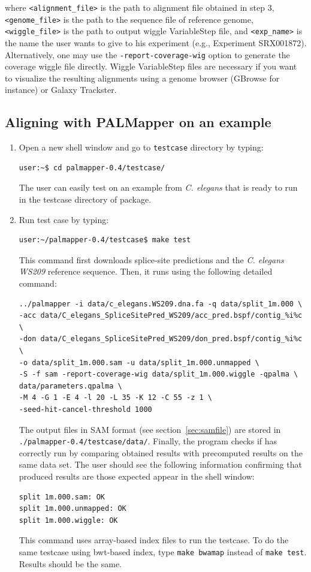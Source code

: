 \documentclass{article}
\begin{document}
\begin{enumerate}
where \texttt{<alignment\_file>} is the path to alignment file
obtained in step 3, \texttt{<genome\_file>} is the path to the
sequence file of reference genome, \texttt{<wiggle\_file>} is the path
to output wiggle VariableStep file, and \texttt{<exp\_name>} is the
name the user wants to give to his experiment (e.g., Experiment
SRX001872). Alternatively, one may use the
\texttt{-report-coverage-wig} option to generate the coverage wiggle
file directly. Wiggle VariableStep files are necessary if you want to
visualize the resulting alignments using a genome browser (GBrowse for
instance) or Galaxy Trackster.  
\end{enumerate}


\subsection{Aligning with PALMapper on an example}
\label{sec:example}

\begin{enumerate}
\item Open a new shell window and go to \texttt{testcase} directory by
  typing: 
\begin{verbatim}
user:~$ cd palmapper-0.4/testcase/
\end{verbatim}
The user can easily test \PALMapper{} on an example from
\emph{C. elegans} that is ready to run in the testcase directory of
\PALMapper{} package.
\item Run test case by typing:
\begin{verbatim}
user:~/palmapper-0.4/testcase$ make test
\end{verbatim}
This command first downloads splice-site predictions and the
\emph{C. elegans WS209} reference sequence. Then, it runs \PALMapper{}
using the following detailed command:
\begin{verbatim}
../palmapper -i data/c_elegans.WS209.dna.fa -q data/split_1m.000 \
-acc data/C_elegans_SpliceSitePred_WS209/acc_pred.bspf/contig_%i%c \
-don data/C_elegans_SpliceSitePred_WS209/don_pred.bspf/contig_%i%c \
-o data/split_1m.000.sam -u data/split_1m.000.unmapped \
-S -f sam -report-coverage-wig data/split_1m.000.wiggle -qpalma \
data/parameters.qpalma \
-M 4 -G 1 -E 4 -l 20 -L 35 -K 12 -C 55 -z 1 \
-seed-hit-cancel-threshold 1000
\end{verbatim}
The output files in SAM format (see section~\ref{sec:samfile}) are
stored in \texttt{./palmapper-0.4/testcase/data/}. Finally, the
program checks if \PALMapper{} has correctly run by comparing obtained
results with precomputed results on the same data set. The user should
see the following information confirming that produced results are
those expected appear in the shell window: 

\begin{verbatim}
split 1m.000.sam: OK
split 1m.000.unmapped: OK
split 1m.000.wiggle: OK
\end{verbatim}

This command uses array-based index files to run the testcase. To do
the same testcase using bwt-based index, type \texttt{make bwamap}
instead of \texttt{make test}. Results should be the same.
\end{enumerate}
\end{document}

